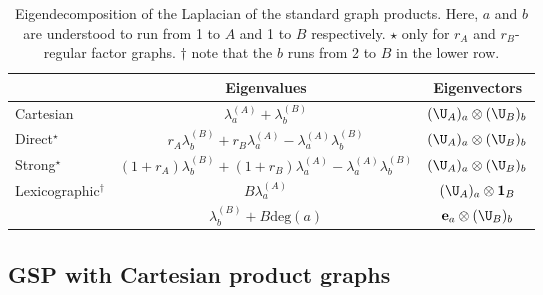 \begin{table}[h]
    \def\arraystretch{1.8}
    \centering
    \small
    \vspace{0.5cm}
    \begin{tabular}{|l|cc|}
        \hline 
    
        & Eigenvalues
        & Eigenvectors \\
    
        \hline
    
        Cartesian 
        & $\lambda_a^{(A)} + \lambda_b^{(B)}$ 
        & $(\U_A)_a \otimes (\U_B)_b$ \\
    
        Direct$^{\star}$
        & $r_A \lambda_b^{(B)} + r_B \lambda_a^{(A)} - \lambda_a^{(A)} \lambda_b^{(B)}$  
        & $(\U_A)_a \otimes (\U_B)_b$ \\
        
        Strong$^{\star}$
        & $(1+r_A) \lambda_b^{(B)} + (1+r_B) \lambda_a ^{(A)}- \lambda_a^{(A)} \lambda_b^{(B)}$
        & $(\U_A)_a \otimes (\U_B)_b$ \\
    
        \multirow{2}{7em}{Lexicographic$^\dagger$}
        & $B \lambda_a^{(A)}$ 
        & $(\U_A)_a \otimes \mathbf{1}_B$ \\

        & $\lambda_b^{(B)} + B \text{deg}(a)$ 
        & $\mathbf{e}_a \otimes (\U_B)_b$  \\
    
        \hline
    
    \end{tabular}
    \vspace{0.2cm}
    \caption[Spectral decomposition of product graphs]{Eigendecomposition of the Laplacian of the standard graph products. Here, $a$ and $b$ are understood to run from 1 to $A$ and 1 to $B$ respectively. $\star$ only for $r_A$ and $r_B$-regular factor graphs. $\dagger$ note that the $b$ runs from 2 to $B$ in the lower row. } 
    \vspace{0.3cm}
    \label{tab:product_graph_spectra}
    \end{table}
    


\subsection{GSP with Cartesian product graphs} 

